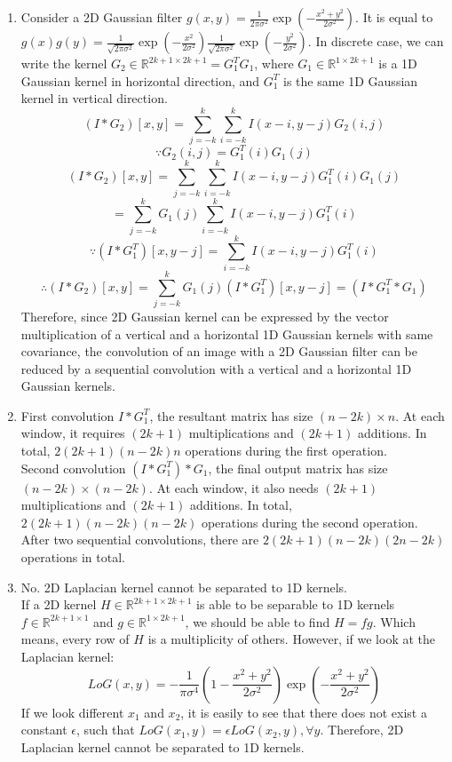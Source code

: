 \documentclass[12pt]{article}
\begin{document}
\begin{enumerate}
\begin{enumerate}
			\item Consider a 2D Gaussian filter $g(x,y)=\frac{1}{2\pi\sigma^2}\exp(-\frac{x^2+y^2}{2\sigma^2})$. It is equal to $g(x)g(y)=\frac{1}{\sqrt{2\pi\sigma^2}}\exp(-\frac{x^2}{2\sigma^2})\frac{1}{\sqrt{2\pi\sigma^2}}\exp(-\frac{y^2}{2\sigma^2})$. In discrete case, we can write the kernel $G_2\in\mathbb{R}^{2k+1\times2k+1}=G_1^TG_1$, where $G_1\in\mathbb{R}^{1\times2k+1}$ is a 1D Gaussian kernel in horizontal direction, and $G_1^T$ is the same 1D Gaussian kernel in vertical direction.
			$$(I*G_2)[x,y]=\sum_{j=-k}^k\sum_{i=-k}^kI(x-i,y-j)G_2(i,j)$$
			$$\because G_2(i,j)=G_1^T(i)G_1(j)$$
			$$(I*G_2)[x,y] = \sum_{j=-k}^k\sum_{i=-k}^kI(x-i,y-j)G_1^T(i)G_1(j)$$
			$$=\sum_{j=-k}^kG_1(j)\sum_{i=-k}^kI(x-i,y-j)G_1^T(i)$$
			$$\because(I*G_1^T)[x,y-j]= \sum_{i=-k}^kI(x-i,y-j)G_1^T(i)$$
			$$\therefore (I*G_2)[x,y] = \sum_{j=-k}^kG_1(j)(I*G_1^T)[x,y-j]=(I*G_1^T*G_1)$$
			Therefore, since 2D Gaussian kernel can be expressed by the vector multiplication of a vertical and a horizontal 1D Gaussian kernels with same covariance, the convolution of an image with a 2D Gaussian filter can be reduced by a sequential convolution with a vertical and a horizontal 1D Gaussian kernels.\\
			
			\item First convolution $I*G_1^T$, the resultant matrix has size $(n-2k)\times n$. At each window, it requires $(2k+1)$ multiplications and $(2k+1)$ additions. In total, $2(2k+1)(n-2k)n$ operations during the first operation.\\
			Second convolution $(I*G_1^T)*G_1$, the final output matrix has size $(n-2k)\times(n-2k)$. At each window, it also needs $(2k+1)$ multiplications and $(2k+1)$ additions. In total, $2(2k+1)(n-2k)(n-2k)$ operations during the second operation.\\
			After two sequential convolutions, there are $2(2k+1)(n-2k)(2n-2k)$ operations in total.\\
			
			\item No. 2D Laplacian kernel cannot be separated to 1D kernels.\\
			 If a 2D kernel $H\in\mathbb{R}^{2k+1\times 2k+1}$ is able to be separable to 1D kernels $f\in\mathbb{R}^{2k+1\times1}$ and $g\in\mathbb{R}^{1\times2k+1}$, we should be able to find $H=fg$. Which means, every row of $H$ is a multiplicity of others. However, if we look at the Laplacian kernel:
			 $$LoG(x,y) = -\frac{1}{\pi\sigma^4} (1-\frac{x^2+y^2}{2\sigma^2})\exp(-\frac{x^2+y^2}{2\sigma^2})$$
			 If we look different $x_1$ and $x_2$, it is easily to see that there does not exist a constant $\epsilon$, such that $LoG(x_1,y)=\epsilon LoG(x_2,y), \forall y$. Therefore, 2D Laplacian kernel cannot be separated to 1D kernels. 
		\end{enumerate}
	\end{enumerate}
	
\end{document}
